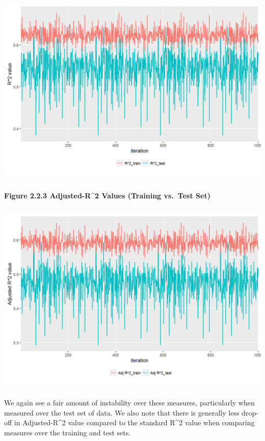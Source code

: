 \documentclass[]{article}
\let\oldparagraph\paragraph
\renewcommand{\paragraph}[1]{\oldparagraph{#1}\mbox{}}
\begin{document}
\includegraphics[height=3.64583in]{images/r2.png}

\newpage

\paragraph{Figure 2.2.3 Adjusted-R\^{}2 Values (Training vs.~Test
Set)}\label{figure-2.2.3-adjusted-r2-values-training-vs.test-set}

\includegraphics[height=3.64583in]{images/adjr2.png}

We again see a fair amount of instability over these measures,
particularly when measured over the test set of data. We also note that
there is generally less drop-off in Adjusted-R\^{}2 value compared to
the standard R\^{}2 value when comparing measures over the training and
test sets.
\end{document}
